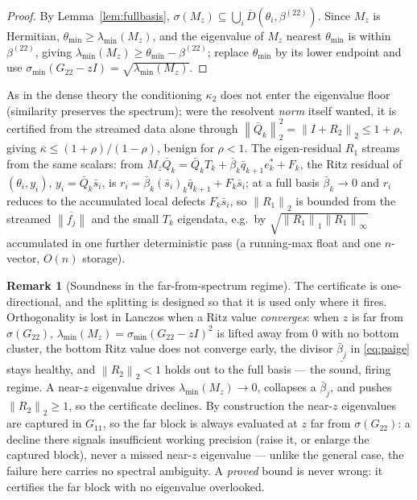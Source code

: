 \documentclass[11pt,a4paper]{article}
\newcommand{\norm}[1]{\left\|#1\right\|}
\newcommand{\spec}{\sigma}
\theoremstyle{plain}
\theoremstyle{definition}
\newtheorem{remark}[theorem]{Remark}
\begin{document}
\begin{proof}
By Lemma~\ref{lem:fullbasis}, $\spec(M_z)\subseteq\bigcup_i\overline D(\theta_i,\beta^{(22)})$.
Since $M_z$ is Hermitian, $\theta_{\min}\ge\lambda_{\min}(M_z)$, and the eigenvalue of $M_z$
nearest $\theta_{\min}$ is within $\beta^{(22)}$, giving
$\lambda_{\min}(M_z)\ge\theta_{\min}-\beta^{(22)}$; replace $\theta_{\min}$ by its lower
endpoint and use $\sigma_{\min}(G_{22}-zI)=\sqrt{\lambda_{\min}(M_z)}$.
\end{proof}

As in the dense theory the conditioning $\kappa_2$ does not enter the eigenvalue floor
(similarity preserves the spectrum); were the resolvent \emph{norm} itself wanted, it is
certified from the streamed data alone through $\norm{\bar Q_k}_2^2=\norm{I+R_2}_2\le1+\rho$,
giving $\overline\kappa\le(1+\rho)/(1-\rho)$, benign for $\rho<1$. The eigen-residual $R_1$
streams from the same scalars: from $M_z\bar Q_k=\bar Q_kT_k+\bar\beta_k\bar q_{k+1}e_k^{*}+F_k$,
the Ritz residual of $(\theta_i,y_i)$, $y_i=\bar Q_k\bar s_i$, is
$r_i=\bar\beta_k(\bar s_i)_k\bar q_{k+1}+F_k\bar s_i$; at a full basis $\bar\beta_k\to0$ and
$r_i$ reduces to the accumulated local defects $F_k\bar s_i$, so $\norm{R_1}_2$ is bounded
from the streamed $\overline{\norm{f_j}}$ and the small $T_k$ eigendata, e.g.\ by
$\sqrt{\norm{R_1}_1\norm{R_1}_\infty}$ accumulated in one further deterministic pass (a
running-max float and one $n$-vector, $O(n)$ storage).

\begin{remark}[Soundness in the far-from-spectrum regime]\label{rem:zfar}
The certificate is one-directional, and the splitting is designed so that it is used only
where it fires. Orthogonality is lost in Lanczos when a Ritz value \emph{converges}: when
$z$ is far from $\spec(G_{22})$, $\lambda_{\min}(M_z)=\sigma_{\min}(G_{22}-zI)^2$ is lifted
away from $0$ with no bottom cluster, the bottom Ritz value does not converge early, the
divisor $\underline{\bar\beta_j}$ in \eqref{eq:paige} stays healthy, and $\norm{R_2}_2<1$
holds out to the full basis --- the sound, firing regime. A near-$z$ eigenvalue drives
$\lambda_{\min}(M_z)\to0$, collapses a $\bar\beta_j$, and pushes $\norm{R_2}_2\ge1$, so the
certificate declines. By construction the near-$z$ eigenvalues are captured in $G_{11}$, so
the far block is always evaluated at $z$ far from $\spec(G_{22})$: a decline there signals
insufficient working precision (raise it, or enlarge the captured block), never a missed
near-$z$ eigenvalue --- unlike the general case, the failure here carries no spectral
ambiguity. A \emph{proved} bound is never wrong: it certifies the far block with no
eigenvalue overlooked.
\end{remark}
\end{document}
